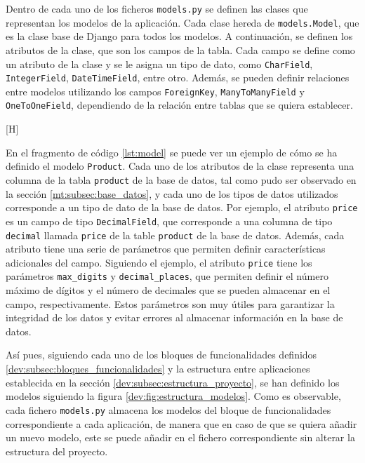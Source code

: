 Dentro de cada uno de los ficheros \texttt{models.py} se definen las clases que representan los modelos de la aplicación. Cada clase hereda de \texttt{models.Model}, que es la clase base de Django para todos los modelos. A continuación, se definen los atributos de la clase, que son los campos de la tabla. Cada campo se define como un atributo de la clase y se le asigna un tipo de dato, como \texttt{CharField}, \texttt{IntegerField}, \texttt{DateTimeField}, entre otro. Además, se pueden definir relaciones entre modelos utilizando los campos \texttt{ForeignKey}, \texttt{ManyToManyField} y \texttt{OneToOneField}, dependiendo de la relación entre tablas que se quiera establecer.

\begin{center}[H]
    \begin{minipage}{0.8\textwidth}
        
    \end{minipage}
\end{center}

En el fragmento de código \ref{lst:model} se puede ver un ejemplo de cómo se ha definido el modelo \texttt{Product}. Cada uno de los atributos de la clase representa una columna de la tabla \texttt{product} de la base de datos, tal como pudo ser observado en la sección \ref{mt:subsec:base_datos}, y cada uno de los tipos de datos utilizados corresponde a un tipo de dato de la base de datos. Por ejemplo, el atributo \texttt{price} es un campo de tipo \texttt{DecimalField}, que corresponde a una columna de tipo \texttt{decimal} llamada \texttt{price} de la table \texttt{product} de la base de datos. Además, cada atributo tiene una serie de parámetros que permiten definir características adicionales del campo. Siguiendo el ejemplo, el atributo \texttt{price} tiene los parámetros \texttt{max\_digits} y \texttt{decimal\_places}, que permiten definir el número máximo de dígitos y el número de decimales que se pueden almacenar en el campo, respectivamente. Estos parámetros son muy útiles para garantizar la integridad de los datos y evitar errores al almacenar información en la base de datos.

Así pues, siguiendo cada uno de los bloques de funcionalidades definidos \ref{dev:subsec:bloques_funcionalidades} y la estructura entre aplicaciones establecida en la sección \ref{dev:subsec:estructura_proyecto}, se han definido los modelos siguiendo la figura \ref{dev:fig:estructura_modelos}. Como es observable, cada fichero \texttt{models.py} almacena los modelos del bloque de funcionalidades correspondiente a cada aplicación, de manera que en caso de que se quiera añadir un nuevo modelo, este se puede añadir en el fichero correspondiente sin alterar la estructura del proyecto.

